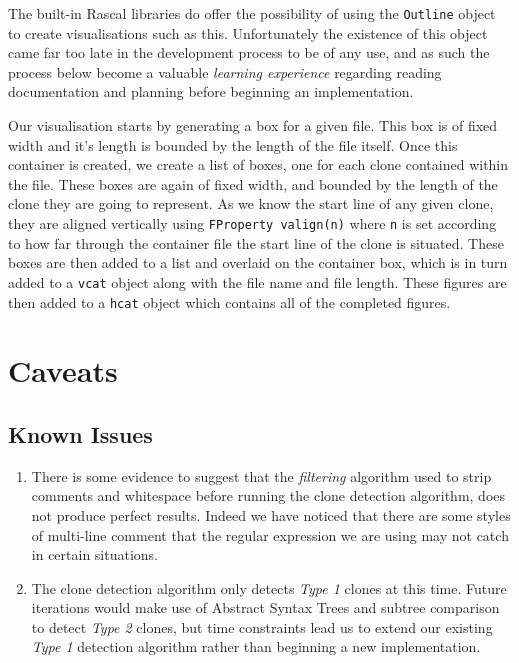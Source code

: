 \documentclass{article}
\begin{document}
The built-in Rascal libraries do offer the possibility of using the \texttt{Outline} object to create visualisations such as this. Unfortunately the existence of this object came far too late in the development process to be of any use, and as such the process below become a valuable \textit{learning experience} regarding reading documentation and planning before beginning an implementation.

Our visualisation starts by generating a box for a given file. This box is of fixed width and it's length is bounded by the length of the file itself. Once this container is created, we create a list of boxes, one for each clone contained within the file. These boxes are again of fixed width, and bounded by the length of the clone they are going to represent. As we know the start line of any given clone, they are aligned vertically using \texttt{FProperty valign(n)} where \texttt{n} is set according to how far through the container file the start line of the clone is situated. These boxes are then added to a list and overlaid on the container box, which is in turn added to a \texttt{vcat} object along with the file name and file length. These figures are then added to a \texttt{hcat} object which contains all of the completed figures.

\section{Caveats}
\subsection{Known Issues}

\begin{enumerate}
\item There is some evidence to suggest that the \textit{filtering} algorithm used to strip comments and whitespace before running the clone detection algorithm, does not produce perfect results. Indeed we have noticed that there are some styles of multi-line comment that the regular expression we are using may not catch in certain situations.
\item The clone detection algorithm only detects \textit{Type 1} clones at this time. Future iterations would make use of Abstract Syntax Trees and subtree comparison to detect \textit{Type 2} clones, but time constraints lead us to extend our existing \textit{Type 1} detection algorithm rather than beginning a new implementation.
\end{enumerate}

\newpage

\end{document}
